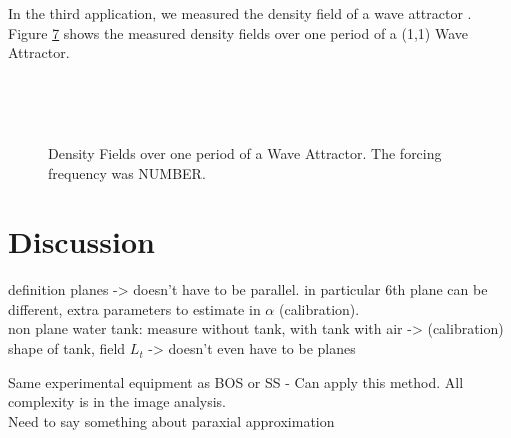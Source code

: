 \documentclass[smallextended]{svjour3}       %
\begin{document}
In the third application, we measured the density field of a wave attractor \cite{maas1997observation}. Figure \ref{figs:WA0side} shows the measured density fields over one period of a (1,1) Wave Attractor. 
\begin{figure}[htbp]
\begin{subfigure}{.5\linewidth}
		\label{fig:WA0side}
\end{subfigure}%
\begin{subfigure}{.5\linewidth}
		\label{fig:WA6side}
\end{subfigure} \\
\begin{subfigure}{.5\linewidth}
		\label{fig:WA3side}
\end{subfigure}%
\begin{subfigure}{.5\linewidth}
		\label{fig:WA2side}
\end{subfigure} \\
\begin{subfigure}{.5\linewidth}
		\label{fig:WA23side}
\end{subfigure}%
\begin{subfigure}{.5\linewidth}
		\label{fig:WA56side}
\end{subfigure} 
\caption{Density Fields over one period of a Wave Attractor. The forcing frequency was NUMBER. }
\label{figs:WA0side}
\end{figure}

\section{Discussion}

definition planes -> doesn't have to be parallel. in particular 6th plane can be different, extra parameters to estimate in $\alpha$ (calibration). \\
non plane water tank: measure without tank, with tank with air -> (calibration) shape of tank, field $L_t$
-> doesn't even have to be planes

Same experimental equipment as BOS or SS - Can apply this method. All complexity is in the image analysis. \\

Need to say something about paraxial approximation
\end{document}
